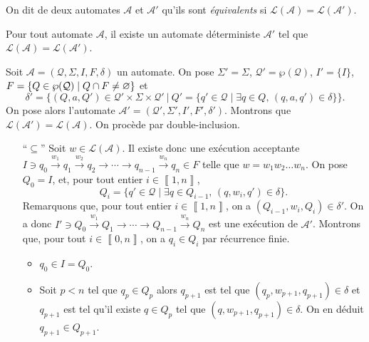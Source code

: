 \begin{defn}
	On dit de deux automates $\mathcal{A}$\/ et $\mathcal{A}'$\/ qu'ils sont {\it équivalents}\/ si $\mathcal{L}(\mathcal{A}) = \mathcal{L}(\mathcal{A}')$.
\end{defn}

\begin{thm}
	Pour tout automate $\mathcal{A}$, il existe un automate déterministe $\mathcal{A}'$\/ tel que $\mathcal{L}(\mathcal{A}) = \mathcal{L}(\mathcal{A}')$.
\end{thm}

\begin{prv}
	Soit $\mathcal{A} = (\mathcal{Q}, \Sigma, I, F, \delta)$\/ un automate.
	On pose $\Sigma' = \Sigma$, $\mathcal{Q}' = \wp(\mathcal{Q})$, $I' = \{I\}$, $F = \{Q \in \wp(\mathcal{Q})  \mid  Q \cap F \neq \varnothing\}$\/ et \[
		\delta' = \bigg\{(Q,a, Q') \in \mathcal{Q}'\times \Sigma\times\mathcal{Q}'\:\bigg|\:Q' = \big\{q' \in \mathcal{Q}  \mid \exists q \in Q,\,(q,a,q') \in \delta\big\}\bigg\}
	.\]
	On pose alors l'automate $\mathcal{A}' = (\mathcal{Q}',\Sigma',I',F',\delta')$. Montrons que $\mathcal{L}(\mathcal{A}') = \mathcal{L}(\mathcal{A})$. On procède par double-inclusion.
	\begin{itemize}
		\item[``$\subseteq$''] Soit $w \in \mathcal{L}(\mathcal{A})$. Il existe donc une exécution acceptante $I \ni q_0\xrightarrow{w_1}q_1\xrightarrow{w_2}q_2\to\cdots\to q_{n-1}\xrightarrow{w_n}q_n \in F$\/ telle que $w = w_1w_2\ldots w_n$.
			On pose $Q_0 = I$, et, pour tout entier $i \in \left\llbracket 1,n \right\rrbracket$,  \[
				Q_i = \big\{q' \in \mathcal{Q}  \mid \exists q \in Q_{i-1},\,(q,w_i,q') \in \delta\big\}
			.\]
			Remarquons que, pour tout entier $i \in \left\llbracket 1,n \right\rrbracket$, on a $(Q_{i-1},w_i,Q_i) \in \delta'$. On a donc $I' \ni Q_0 \xrightarrow{w_1} Q_1 \to \cdots \to Q_{n-1} \xrightarrow{w_n} Q_n$\/ est une exécution de $\mathcal{A}'$.
			Montrons que, pour tout $i \in \left\llbracket 0,n \right\rrbracket$, on a $q_i \in Q_i$ par récurrence finie.
			\begin{itemize}
				\item $q_0 \in I = Q_0$.
				\item Soit $p < n$\/ tel que $q_p \in Q_p$\/ alors $q_{p+1}$\/ est tel que $(q_p, w_{p+1}, q_{p+1}) \in \delta$\/ et $q_{p+1}$\/ est tel qu'il existe $q \in Q_p$\/ tel que $(q, w_{p+1}, q_{p+1}) \in \delta$. On en déduit $q_{p+1} \in Q_{p+1}$.
			\end{itemize}

\end{itemize}
\end{prv}

